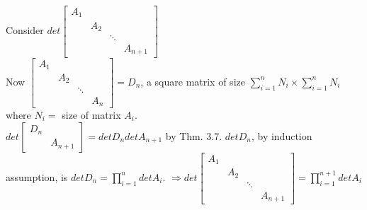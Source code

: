 \documentclass[twoside]{amsart}
\theoremstyle{plain}
\theoremstyle{definition}
\begin{document}
\begin{enumerate}
Consider $det{ \left[ \begin{matrix} A_1 & & & \\ & A_2 & & \\ & & \ddots & \\ & & & A_{n+1} \end{matrix} \right]}$ \\
Now $\left[ \begin{matrix} A_1 & & & \\ & A_2 & & \\ & & \ddots & \\ & & & A_n \end{matrix} \right] = D_n$, a square matrix of size $\sum_{i=1}^n N_i \times \sum_{i=1}^n N_i$ where $N_i = $ size of matrix $A_i$.  \\
$det{\left[ \begin{matrix} D_n & \\ & A_{n+1} \end{matrix} \right]} = det{D_n}det{A_{n+1}}$ by Thm. 3.7.  $det{D_n}$, by induction assumption, is $det{D_n} = \prod_{i=1}^n det{A_i}$.  $\Longrightarrow det{ \left[ \begin{matrix} A_1 & & & \\ & A_2 && \\ & & \ddots & \\ & & & A_{n+1} \end{matrix} \right]} = \prod_{i=1}^{n+1} det{A_i}$
\end{enumerate}
\end{document}
